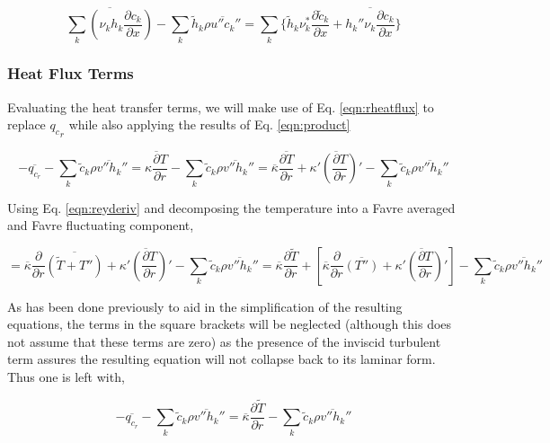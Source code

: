 \begin{equation}
	\overline{\sum_k (\nu_k h_k\frac{\partial c_k}{\partial x})} - \sum_k \tilde h_k \overline{\rho u'' c_k''} =
	\sum_{k}\Big\{\tilde h_k \nu_k^* \frac{\partial \tilde c_k}{\partial x} 
	+ \overline{h_k'' \nu_k \frac{\partial c_k}{\partial x}}\Big\}
\label{eqn:xdiffturb}
\end{equation}

\subsubsection{Heat Flux Terms}

	Evaluating the heat transfer terms, we will make use of Eq. \ref{eqn:rheatflux} to replace ${q_c}_r$
while also applying the results of Eq. \ref{eqn:product}

\begin{displaymath}
	-\overline{q_{c_r}} - \sum_k \tilde c_k \overline{\rho v'' h_k''} = \overline{\kappa \frac{\partial T}{\partial r}}
	- \sum_k \tilde c_k \overline{\rho v'' h_k''} = \overline{\kappa}\overline{\frac{\partial T}{\partial r}}
	+\overline{\kappa ' (\frac{\partial T}{\partial r})'} - \sum_k \tilde c_k \overline{\rho v'' h_k''}
\end{displaymath}

	Using Eq. \ref{eqn:reyderiv} and decomposing the temperature into a Favre averaged and Favre fluctuating component,

\begin{displaymath}
	= \overline{\kappa}\frac{\partial}{\partial r}
	\overline{(\tilde T + T'')} + \overline{\kappa '(\frac{\partial T}{\partial r})'}
	- \sum_k \tilde c_k \overline{\rho v'' h_k''} = \overline{\kappa}\frac{\partial \tilde T}{\partial r}
	+ [\overline{\kappa}\frac{\partial}{\partial r}\overline{(T'')} + \overline{\kappa '(\frac{\partial T}{\partial r})'}]
	- \sum_k \tilde c_k \overline{\rho v'' h_k''}	
\end{displaymath}

	As has been done previously to aid in the simplification of the resulting equations, the terms in the
square brackets will be neglected (although this does not assume that these terms are zero) as the 
presence of the inviscid turbulent term assures the resulting equation will not collapse back to its laminar form.
Thus one is left with,

\begin{displaymath}
	-\overline{q_{c_r}} - \sum_k \tilde c_k \overline{\rho v'' h_k''} = 
	\overline{\kappa}\frac{\partial \tilde T}{\partial r} - \sum_k \tilde c_k \overline{\rho v'' h_k''}	
\end{displaymath}	


